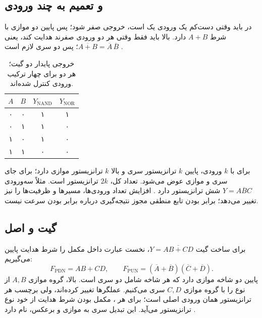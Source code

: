 \subsection{ و تعمیم به چند ورودی}
در  باید وقتی دست‌کم یک ورودی یک است، خروجی صفر شود؛
پس پایین دو  موازی با شرط \(A+B\) دارد.
بالا باید فقط وقتی هر دو ورودی صفرند هدایت کند، یعنی
\(\overline{A+B}=\overline{A}\,\overline{B}\)؛ پس دو  سری لازم است
\cite[بخش ]{weste}\cite[اسلاید ۲۵]{intro}.
\begin{table}[ht]
\centering
\caption{خروجی پایدار دو گیت؛ هر دو برای چهار ترکیب ورودی کنترل شده‌اند.}
\label{tab:ch1-gates}
\begin{tabular}{cccc}
\toprule
\(A\)&\(B\)&\(Y_{\mathrm{NAND}}\)&\(Y_{\mathrm{NOR}}\)\\
\midrule
۰&۰&۱&۱\\
۰&۱&۱&۰\\
۱&۰&۱&۰\\
۱&۱&۰&۰\\
\bottomrule
\end{tabular}
\end{table}
برای  با \(k\) ورودی، پایین \(k\) ترانزیستور سری و بالا \(k\)
ترانزیستور موازی دارد؛ برای  جای سری و موازی عوض می‌شود.
تعداد کل، \(2k\) ترانزیستور است.
مثلاً  سه‌ورودی \(Y=\overline{ABC}\) شش ترانزیستور دارد
\cite[اسلاید ۲۶]{intro}.
افزایش تعداد ورودی‌ها، مسیرها و ظرفیت‌ها را نیز تغییر می‌دهد؛
برابر بودن تابع منطقی مجوز نتیجه‌گیری درباره برابر بودن سرعت نیست.

\subsection{گیت  و اصل }
برای ساخت گیت \(Y=\overline{AB+CD}\)، نخست عبارت داخل مکمل را
شرط هدایت پایین می‌گیریم:
\begin{equation}\label{eq:ch1-aoi}
F_{\mathrm{PDN}}=AB+CD,\qquad
F_{\mathrm{PUN}}=(\overline{A}+\overline{B})(\overline{C}+\overline{D}).
\end{equation}
پایین دو شاخه موازی دارد که هر شاخه شامل دو  سری است.
بالا، گروه موازی \(A,B\) از نوع  را با گروه موازی \(C,D\) سری می‌کنیم.
عملگرها تغییر کرده‌اند، ولی برچسب  هر ترانزیستور همان ورودی اصلی است؛
برای هر ، مکمل بودن شرط هدایت از خود نوع ترانزیستور می‌آید.
این تبدیل سری به موازی و برعکس،  نام دارد
\cite[بخش  و شکل ]{weste}.

